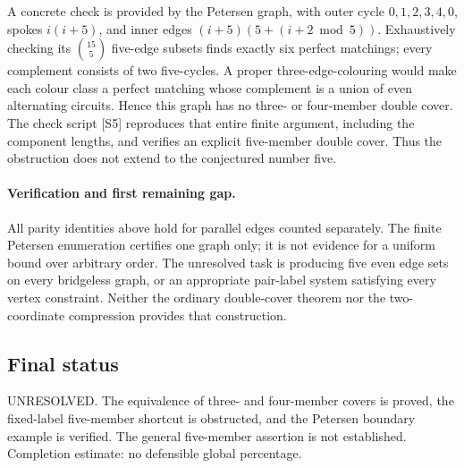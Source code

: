 \documentclass[11pt,a4paper]{article}
\begin{document}
A concrete check is provided by the Petersen graph, with outer cycle
$0,1,2,3,4,0$, spokes $i(i+5)$, and inner edges
$(i+5)(5+(i+2\bmod5))$. Exhaustively checking its $\binom{15}{5}$
five-edge subsets finds exactly six perfect matchings; every complement
consists of two five-cycles. A proper three-edge-colouring would make
each colour class a perfect matching whose complement is a union of
even alternating circuits. Hence this graph has no three- or
four-member double cover. The check script [S5] reproduces that entire
finite argument, including the component lengths, and verifies an
explicit five-member double cover. Thus the obstruction does not extend
to the conjectured number five.

\paragraph{Verification and first remaining gap.}
All parity identities above hold for parallel edges counted separately.
The finite Petersen enumeration certifies one graph only; it is not
evidence for a uniform bound over arbitrary order. The unresolved task
is producing five even edge sets on every bridgeless graph, or an
appropriate pair-label system satisfying every vertex constraint. Neither
the ordinary double-cover theorem nor the two-coordinate compression
provides that construction.

\subsection{Final status}
UNRESOLVED. The equivalence of three- and four-member covers is proved,
the fixed-label five-member shortcut is obstructed, and the Petersen
boundary example is verified. The general five-member assertion is
not established. Completion estimate: no defensible global percentage.
\end{document}
